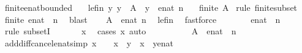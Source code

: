 \begin{isabellebody}
\isanewline
%
\endisadelimproof
\isanewline
{}\isamarkupfalse%
\isanewline
\isanewline
{}\isamarkupfalse%
\ finite{\isacharunderscore}enat{\isacharunderscore}bounded{\isacharcolon}\isanewline
\ \ \ le{\isacharunderscore}fin{\isacharcolon}\ {\isachardoublequoteopen}{\isasymAnd}y{\isachardot}\ y\ {\isasymin}\ A\ {\isasymLongrightarrow}\ y\ {\isasymle}\ enat\ n{\isachardoublequoteclose}\isanewline
\ \ \ {\isachardoublequoteopen}finite\ A{\isachardoublequoteclose}\isanewline
%
\isadelimproof
%
\endisadelimproof
%
\isatagproof
{}\isamarkupfalse%
\ {\isacharparenleft}rule\ finite{\isacharunderscore}subset{\isacharparenright}\isanewline
\ \ \isamarkupfalse%
\ {\isachardoublequoteopen}finite\ {\isacharparenleft}enat\ {\isacharbackquote}\ {\isacharbraceleft}{\isachardot}{\isachardot}n{\isacharbraceright}{\isacharparenright}{\isachardoublequoteclose}\ \isamarkupfalse%
\ blast\isanewline
\ \ \isamarkupfalse%
\ {\isachardoublequoteopen}A\ {\isasymsubseteq}\ {\isacharbraceleft}{\isachardot}{\isachardot}enat\ n{\isacharbraceright}{\isachardoublequoteclose}\ \isamarkupfalse%
\ le{\isacharunderscore}fin\ \isamarkupfalse%
\ fastforce\isanewline
\ \ \isamarkupfalse%
\ \isamarkupfalse%
\ {\isachardoublequoteopen}{\isasymdots}\ {\isasymsubseteq}\ enat\ {\isacharbackquote}\ {\isacharbraceleft}{\isachardot}{\isachardot}n{\isacharbraceright}{\isachardoublequoteclose}\isanewline
\ \ \ \ \isamarkupfalse%
\ {\isacharparenleft}rule\ subsetI{\isacharparenright}\isanewline
\ \ \ \ \isamarkupfalse%
\ \ x\ \isamarkupfalse%
\ {\isacharparenleft}cases\ x{\isacharparenright}\ auto\isanewline
\ \ \ \ \isamarkupfalse%
\isanewline
\ \ \isamarkupfalse%
\ \isamarkupfalse%
\ {\isachardoublequoteopen}A\ {\isasymsubseteq}\ enat\ {\isacharbackquote}\ {\isacharbraceleft}{\isachardot}{\isachardot}n{\isacharbraceright}{\isachardoublequoteclose}\ \isacommand{{\isachardot}}\isamarkupfalse%
\isanewline
{}\isamarkupfalse%
%
\endisatagproof
{\isafoldproof}%
%
\isadelimproof
%
\endisadelimproof
%
\isadelimdocument
%
\endisadelimdocument
%
\isatagdocument
%
\isamarkuptrue%
%
\endisatagdocument
{\isafolddocument}%
%
\isadelimdocument
%
\endisadelimdocument
{}\isamarkupfalse%
\ add{\isacharunderscore}diff{\isacharunderscore}cancel{\isacharunderscore}enat{\isacharbrackleft}simp{\isacharbrackright}{\isacharcolon}\ {\isachardoublequoteopen}x\ {\isasymnoteq}\ {\isasyminfinity}\ {\isasymLongrightarrow}\ x\ {\isacharplus}\ y\ {\isacharminus}\ x\ {\isacharequal}\ {\isacharparenleft}y{\isacharcolon}{\isacharcolon}enat{\isacharparenright}{\isachardoublequoteclose}\isanewline

\end{isabellebody}
